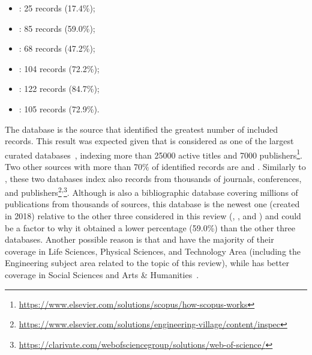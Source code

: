 \begin{itemize}[nosep]
\item {}: 25 records (17.4\%);
\item {}: 85 records (59.0\%);
\item {}: 68 records (47.2\%);
\item {}: 104 records (72.2\%);
\item {}: 122 records (84.7\%);
\item {}: 105 records (72.9\%).
\end{itemize}

The database  is the source that identified the greatest number of included records. This result was expected given that  is considered as one of the largest curated databases~\parencite{methodology:search:db:coverage:dim-scopus-wos}, indexing more than 25000 active titles and 7000 publishers\footnote{\url{https://www.elsevier.com/solutions/scopus/how-scopus-works}}.
Two other sources with more than 70\% of identified records are  and . Similarly to , these two databases index also records from thousands of journals, conferences, and publishers\footnote{\url{https://www.elsevier.com/solutions/engineering-village/content/inspec}}\textsuperscript{,}\footnote{\url{https://clarivate.com/webofsciencegroup/solutions/web-of-science/}}.
Although  is also a bibliographic database covering millions of publications from thousands of sources, this database is the newest one (created in 2018) relative to the other three considered in this review (, , and ) and could be a factor to why it obtained a lower percentage (59.0\%) than the other three databases. Another possible reason is that  and  have the majority of their coverage in Life Sciences, Physical Sciences, and Technology Area (including the Engineering subject area related to the topic of this review), while  has better coverage in Social Sciences and Arts \& Humanities~\parencite{methodology:search:db:coverage:dim-scopus-wos}.
